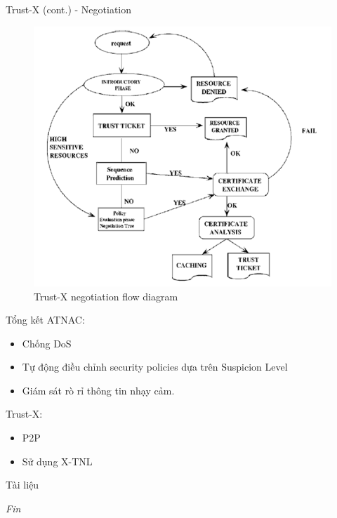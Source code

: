 \documentclass[11pt]{beamer}
\begin{document}
\begin{frame}{Trust-X (cont.) - Negotiation}
\begin{figure}
\centering
\includegraphics[scale=.5]{img/trustx-architecture.png}
\caption{Trust-X negotiation flow diagram}
\label{fig:trust-x-architecture}
\end{figure}
\end{frame}

\begin{frame}{Tổng kết}
ATNAC:
\begin{itemize}
\item Chống DoS
\item Tự động điều chỉnh security policies dựa trên Suspicion Level
\item Giám sát rò rỉ thông tin nhạy cảm.
\end{itemize}
Trust-X:
\begin{itemize}
\item P2P
\item Sử dụng X-TNL
\end{itemize}
\end{frame}

\begin{frame}[allowframebreaks]{Tài liệu}
\printbibliography
\end{frame}

\begin{frame}{}
\centering \Large
\emph{Fin}
\end{frame}
\end{document}
